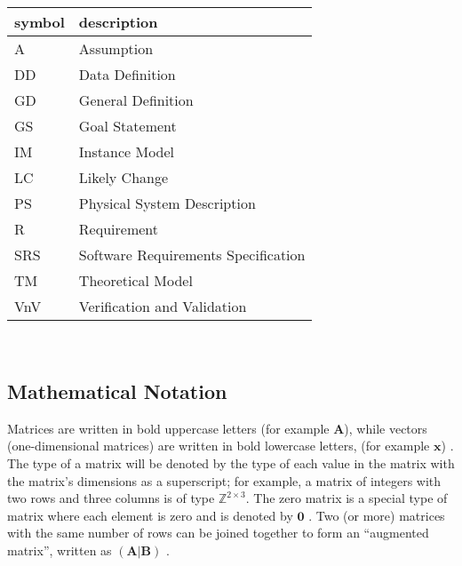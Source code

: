 \documentclass[12pt]{article}
\begin{document}
\renewcommand{\arraystretch}{1.2}
\begin{tabular}{l l}
  \toprule
  \textbf{symbol} & \textbf{description}                \\
  \midrule
  A               & Assumption                          \\
  DD              & Data Definition                     \\
  GD              & General Definition                  \\
  GS              & Goal Statement                      \\
  IM              & Instance Model                      \\
  LC              & Likely Change                       \\
  PS              & Physical System Description         \\
  R               & Requirement                         \\
  SRS             & Software Requirements Specification \\
  TM              & Theoretical Model                   \\
  VnV             & Verification and Validation         \\
  \bottomrule
\end{tabular}\\

\subsection{Mathematical Notation} \label{sec_mathNot}

Matrices are written in bold uppercase letters (for example $\textbf{A}$), while
vectors (one-dimensional matrices) are written in bold lowercase letters, (for
example
$\textbf{x}$) \cite{osullivan_appendix_2010}. The type of a matrix will be
denoted by the type of each value in the matrix with the matrix's dimensions
as a superscript; for example, a matrix of integers with two rows and three
columns is of type $\mathbb{Z}^{2 \times 3}$.  The zero matrix is a special type
of matrix where each element is zero and is denoted by $\textbf{0}$
\cite{weisstein_zero_2023}.
Two (or more) matrices with the same
number of rows can be joined together to form an ``augmented matrix'', written
as $\left(\textbf{A}\vert \textbf{B}\right)$ \cite{taboga_augmented_2021}.
\end{document}
